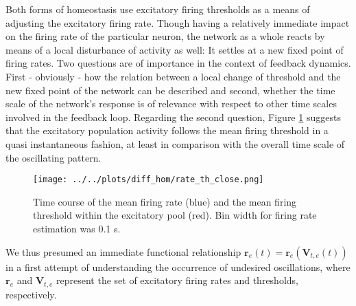 \documentclass[10pt,a4paper]{article}
\begin{document}
Both forms of homeostasis use excitatory firing thresholds as a means of adjusting the excitatory firing rate. Though having a relatively immediate impact on the firing rate of the particular neuron, the network as a whole reacts by means of a local disturbance of activity as well: It settles at a new fixed point of firing rates. Two questions are of importance in the context of feedback dynamics. First - obviously - how the relation between a local change of threshold and the new fixed point of the network can be described and second, whether the time scale of the network's response is of relevance with respect to other time scales involved in the feedback loop. Regarding the second question, Figure \ref{rate_th_close} suggests that the excitatory population activity follows the mean firing threshold in a quasi instantaneous fashion, at least in comparison with the overall time scale of the oscillating pattern.
\begin{figure}
\begin{center}
\texttt{[image: ../../plots/diff\_hom/rate\_th\_close.png]}
\end{center}
\caption{Time course of the mean firing rate (blue) and the mean firing threshold within the excitatory pool (red). Bin width for firing rate estimation was 0.1 s.}
\label{rate_th_close}
\end{figure}
We thus presumed an immediate functional relationship $\mathbf{r}_e (t) = \mathbf{r}_e (\mathbf{V}_{t,e} (t))$ in a first attempt of understanding the occurrence of undesired oscillations, where $\mathbf{r}_e$ and $\mathbf{V}_{t,e}$ represent the set of excitatory firing rates and thresholds, respectively.
\end{document}
